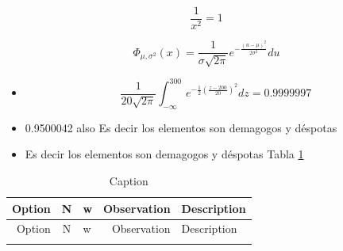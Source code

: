 \documentclass[10pt,]{krantz}
\providecommand{\tightlist}{%
  \setlength{\itemsep}{0pt}\setlength{\parskip}{0pt}}
\theoremstyle{definition}
\theoremstyle{definition}
\theoremstyle{definition}
\theoremstyle{definition}
\theoremstyle{remark}
\begin{document}
\[ \frac{1}{x^2}
= 1 \]

\[\Phi_{\mu , \sigma ^{2}}(x)=\frac {1}{\sigma {\sqrt {2\pi }}}e^{-{\frac {(u-\mu )^{2}}{2\sigma ^{2}}}}du
\]

\begin{itemize}
\tightlist
\item
  \[\frac{1}{20\sqrt{2\pi }}\int_{-\infty }^{ 300}e^{- \frac{1}{2}\left(\frac{z-200}{20}\right)^2}dz=0.9999997\]
\item
  0.9500042 also Es decir los elementos son demagogos y déspotas
\item
  Es decir los elementos son demagogos y déspotas
  Tabla \ref{tab:ww1}
\end{itemize}

\begin{longtable}[]{@{}rclrl@{}}
\caption{\label{tab:ww1} Caption}\tabularnewline
\toprule
\begin{minipage}[b]{0.26\columnwidth}\raggedleft
Option\strut
\end{minipage} & \begin{minipage}[b]{0.08\columnwidth}\centering
N\strut
\end{minipage} & \begin{minipage}[b]{0.03\columnwidth}\raggedright
w\strut
\end{minipage} & \begin{minipage}[b]{0.23\columnwidth}\raggedleft
Observation\strut
\end{minipage} & \begin{minipage}[b]{0.26\columnwidth}\raggedright
Description\strut
\end{minipage}\tabularnewline
\midrule
\endfirsthead
\toprule
\begin{minipage}[b]{0.26\columnwidth}\raggedleft
Option\strut
\end{minipage} & \begin{minipage}[b]{0.08\columnwidth}\centering
N\strut
\end{minipage} & \begin{minipage}[b]{0.03\columnwidth}\raggedright
w\strut
\end{minipage} & \begin{minipage}[b]{0.23\columnwidth}\raggedleft
Observation\strut
\end{minipage} & \begin{minipage}[b]{0.26\columnwidth}\raggedright
Description\strut
\end{minipage}\tabularnewline
\midrule
\endhead
\begin{minipage}[t]{0.26\columnwidth}\raggedleft

\end{minipage}
\end{longtable}
\end{document}

